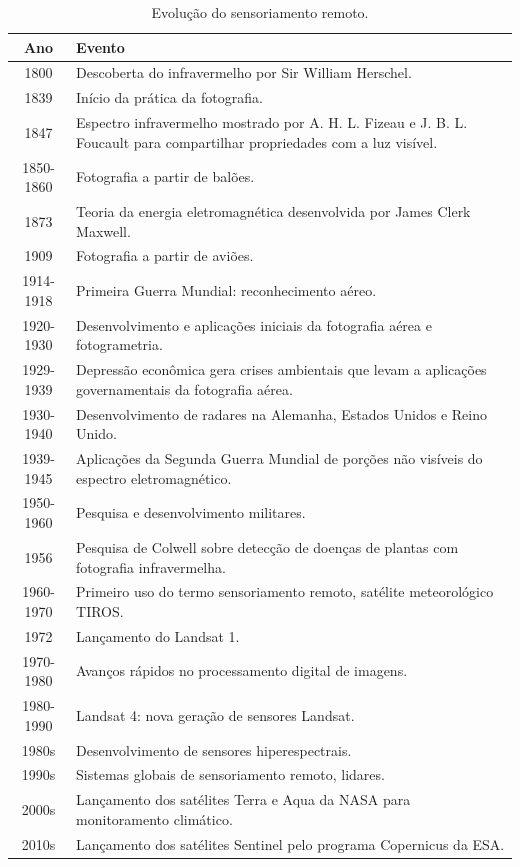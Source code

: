 \begin{table}[!htb]
\caption{Evolução do sensoriamento remoto.} \label{tab:evolucao_sr}
\begin{tabularx}{\textwidth}{|c|X|} \hline
\textbf{Ano} & \textbf{Evento} \\ \hline
1800         & Descoberta do infravermelho por Sir William Herschel. \\ \hline
1839         & Início da prática da fotografia. \\ \hline
1847         & Espectro infravermelho mostrado por A. H. L. Fizeau e J. B. L. Foucault para compartilhar propriedades com a luz visível. \\ \hline
1850-1860    & Fotografia a partir de balões. \\ \hline
1873         & Teoria da energia eletromagnética desenvolvida por James Clerk Maxwell. \\ \hline
1909         & Fotografia a partir de aviões. \\ \hline
1914-1918    & Primeira Guerra Mundial: reconhecimento aéreo. \\ \hline
1920-1930    & Desenvolvimento e aplicações iniciais da fotografia aérea e fotogrametria. \\ \hline
1929-1939    & Depressão econômica gera crises ambientais que levam a aplicações governamentais da fotografia aérea. \\ \hline
1930-1940    & Desenvolvimento de radares na Alemanha, Estados Unidos e Reino Unido. \\ \hline
1939-1945    & Aplicações da Segunda Guerra Mundial de porções não visíveis do espectro eletromagnético. \\ \hline
1950-1960    & Pesquisa e desenvolvimento militares. \\ \hline
1956         & Pesquisa de Colwell sobre detecção de doenças de plantas com fotografia infravermelha. \\ \hline
1960-1970    & Primeiro uso do termo sensoriamento remoto, satélite meteorológico TIROS. \\ \hline
1972         & Lançamento do Landsat 1. \\ \hline
1970-1980    & Avanços rápidos no processamento digital de imagens. \\ \hline
1980-1990    & Landsat 4: nova geração de sensores Landsat. \\ \hline
1980s        & Desenvolvimento de sensores hiperespectrais. \\ \hline
1990s        & Sistemas globais de sensoriamento remoto, lidares. \\ \hline
2000s        & Lançamento dos satélites Terra e Aqua da NASA para monitoramento climático. \\ \hline
2010s        & Lançamento dos satélites Sentinel pelo programa Copernicus da ESA. \\ \hline
\end{tabularx}
\end{table}

